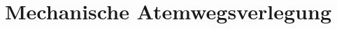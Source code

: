 \clearpage
{}





% 
% 
% 
% 


\section{Mechanische Atemwegsverlegung}
\label{topic:mechanische-atemwegsverlegung}
\label{topic:fremdkoerperaspiration}

